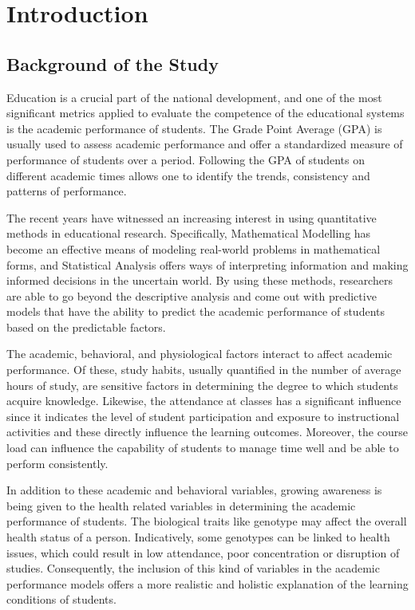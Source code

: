\documentclass[12pt]{report}
\begin{document}
	   
	\chapter{Introduction}
	
	\section{Background of the Study}
	
	Education is a crucial part of the national development, and one of the most significant metrics applied to evaluate the competence of the educational systems is the academic performance of students. The Grade Point Average (GPA) is usually used to assess academic performance and offer a standardized measure of performance of students over a period. Following the GPA of students on different academic times allows one to identify the trends, consistency and patterns of performance.
	
	The recent years have witnessed an increasing interest in using quantitative methods in educational research. Specifically, Mathematical Modelling has become an effective means of modeling real-world problems in mathematical forms, and Statistical Analysis offers ways of interpreting information and making informed decisions in the uncertain world. By using these methods, researchers are able to go beyond the descriptive analysis and come out with predictive models that have the ability to predict the academic performance of students based on the predictable factors.
	
	The academic, behavioral, and physiological factors interact to affect academic performance. Of these, study habits, usually quantified in the number of average hours of study, are sensitive factors in determining the degree to which students acquire knowledge. Likewise, the attendance at classes has a significant influence since it indicates the level of student participation and exposure to instructional activities and these directly influence the learning outcomes. Moreover, the course load can influence the capability of students to manage time well and be able to perform consistently.
	
	In addition to these academic and behavioral variables, growing awareness is being given to the health related variables in determining the academic performance of students. The biological traits like genotype may affect the overall health status of a person. Indicatively, some genotypes can be linked to health issues, which could result in low attendance, poor concentration or disruption of studies. Consequently, the inclusion of this kind of variables in the academic performance models offers a more realistic and holistic explanation of the learning conditions of students.
	
\end{document}
